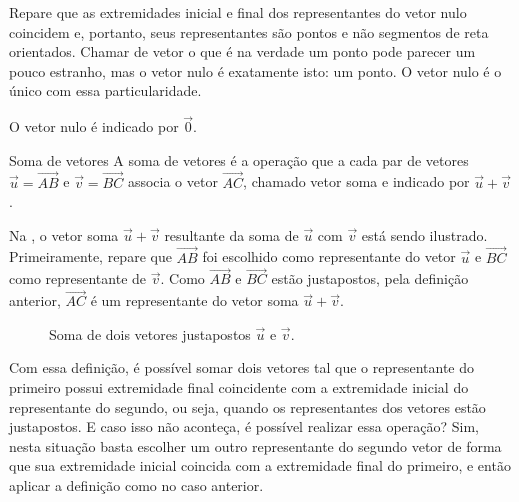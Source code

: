 Repare que as extremidades inicial e final dos representantes do vetor nulo coincidem e, portanto, seus representantes são pontos e não segmentos de reta orientados. Chamar de vetor o que é na verdade um ponto pode parecer um pouco estranho, mas o vetor nulo é exatamente isto: um ponto. O vetor nulo é o único com essa particularidade.

O vetor nulo é indicado por \(\vec{0}\).
\begin{observationtitle}{Soma de vetores}
A soma de vetores é a operação que a cada par de vetores \(\vec{u}=\overrightarrow{AB}\) e \(\vec{v}=\overrightarrow{BC}\) associa o vetor \(\overrightarrow{AC}\), chamado vetor soma e indicado por \(\vec{u}+\vec{v}\).
\end{observationtitle}

Na , o vetor soma \(\vec{u}+\vec{v}\) resultante da soma de \(\vec{u}\) com \(\vec{v}\) está sendo ilustrado. Primeiramente, repare que \(\overrightarrow{AB}\) foi escolhido como representante do vetor \(\vec{u}\) e \(\overrightarrow{BC}\) como representante de \(\vec{v}\). Como \(\overrightarrow{AB}\) e \(\overrightarrow{BC}\) estão justapostos, pela definição anterior, \(\overrightarrow{AC}\) é um representante do vetor soma \(\vec{u}+\vec{v}\).
\begin{figure}[H]
\centering
{} 
 \caption{Soma de dois vetores justapostos $\vec{u}$ e $\vec{v}$.} \label{fig-geometria-operacoesvetores-08}
 \end{figure}
Com essa definição, é possível somar dois vetores tal que o representante do primeiro possui extremidade final coincidente com a extremidade inicial do representante do segundo, ou seja, quando os representantes dos vetores estão justapostos. E caso isso não aconteça, é possível realizar essa operação? Sim, nesta situação basta escolher um outro representante do segundo vetor de forma que sua extremidade inicial coincida com a extremidade final do primeiro, e então aplicar a definição como no caso anterior.
